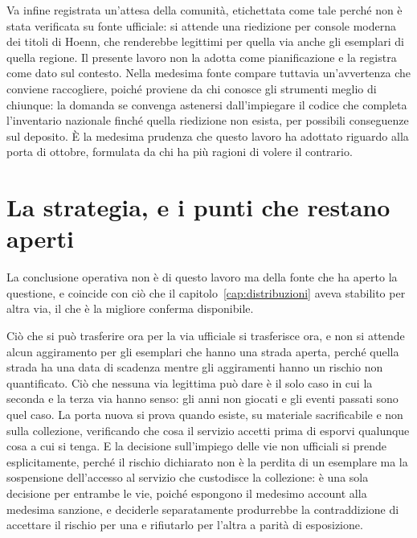 Va infine registrata un'attesa della comunità, etichettata come tale perché non è stata verificata su fonte ufficiale: si attende una riedizione per console moderna dei titoli di Hoenn, che renderebbe legittimi per quella via anche gli esemplari di quella regione. Il presente lavoro non la adotta come pianificazione e la registra come dato sul contesto. Nella medesima fonte compare tuttavia un'avvertenza che conviene raccogliere, poiché proviene da chi conosce gli strumenti meglio di chiunque: la domanda se convenga astenersi dall'impiegare il codice che completa l'inventario nazionale finché quella riedizione non esista, per possibili conseguenze sul deposito. È la medesima prudenza che questo lavoro ha adottato riguardo alla porta di ottobre, formulata da chi ha più ragioni di volere il contrario.

\section{La strategia, e i punti che restano aperti}

La conclusione operativa non è di questo lavoro ma della fonte che ha aperto la questione, e coincide con ciò che il capitolo~\ref{cap:distribuzioni} aveva stabilito per altra via, il che è la migliore conferma disponibile.

Ciò che si può trasferire ora per la via ufficiale si trasferisce ora, e non si attende alcun aggiramento per gli esemplari che hanno una strada aperta, perché quella strada ha una data di scadenza mentre gli aggiramenti hanno un rischio non quantificato. Ciò che nessuna via legittima può dare è il solo caso in cui la seconda e la terza via hanno senso: gli anni non giocati e gli eventi passati sono quel caso. La porta nuova si prova quando esiste, su materiale sacrificabile e non sulla collezione, verificando che cosa il servizio accetti prima di esporvi qualunque cosa a cui si tenga. E la decisione sull'impiego delle vie non ufficiali si prende esplicitamente, perché il rischio dichiarato non è la perdita di un esemplare ma la sospensione dell'accesso al servizio che custodisce la collezione: è una sola decisione per entrambe le vie, poiché espongono il medesimo account alla medesima sanzione, e deciderle separatamente produrrebbe la contraddizione di accettare il rischio per una e rifiutarlo per l'altra a parità di esposizione.

